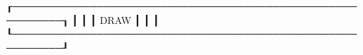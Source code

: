 ┎─────────────────────────────────────────────────────────┒
┃                                                         ┃
┃                           DRAW                          ┃
┃                                                         ┃
┖─────────────────────────────────────────────────────────┚
